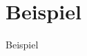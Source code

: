 \section{Beispiel}

Beispiel

\cite{inproceedings}

\cite{article}

\cite{patent}

\cite{book}

\cite{electronic}